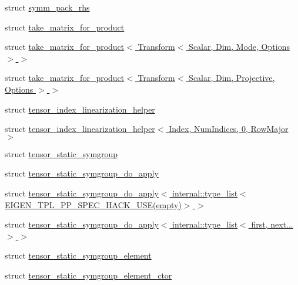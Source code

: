 \begin{DoxyCompactItemize}
\item 
struct \hyperlink{struct_eigen_1_1internal_1_1symm__pack__rhs}{symm\+\_\+pack\+\_\+rhs}
\item 
struct \hyperlink{struct_eigen_1_1internal_1_1take__matrix__for__product}{take\+\_\+matrix\+\_\+for\+\_\+product}
\item 
struct \hyperlink{struct_eigen_1_1internal_1_1take__matrix__for__product_3_01_transform_3_01_scalar_00_01_dim_00_01_mode_00_01_options_01_4_01_4}{take\+\_\+matrix\+\_\+for\+\_\+product$<$ Transform$<$ Scalar, Dim, Mode, Options $>$ $>$}
\item 
struct \hyperlink{struct_eigen_1_1internal_1_1take__matrix__for__product_3_01_transform_3_01_scalar_00_01_dim_00_0edf36e01556babc5f053852863696371}{take\+\_\+matrix\+\_\+for\+\_\+product$<$ Transform$<$ Scalar, Dim, Projective, Options $>$ $>$}
\item 
struct \hyperlink{struct_eigen_1_1internal_1_1tensor__index__linearization__helper}{tensor\+\_\+index\+\_\+linearization\+\_\+helper}
\item 
struct \hyperlink{struct_eigen_1_1internal_1_1tensor__index__linearization__helper_3_01_index_00_01_num_indices_00_010_00_01_row_major_01_4}{tensor\+\_\+index\+\_\+linearization\+\_\+helper$<$ Index, Num\+Indices, 0, Row\+Major $>$}
\item 
struct \hyperlink{struct_eigen_1_1internal_1_1tensor__static__symgroup}{tensor\+\_\+static\+\_\+symgroup}
\item 
struct \hyperlink{struct_eigen_1_1internal_1_1tensor__static__symgroup__do__apply}{tensor\+\_\+static\+\_\+symgroup\+\_\+do\+\_\+apply}
\item 
struct \hyperlink{struct_eigen_1_1internal_1_1tensor__static__symgroup__do__apply_3_01internal_1_1type__list_3_01_c8ec19381230c5f4f1bbf94f4e53c0f0}{tensor\+\_\+static\+\_\+symgroup\+\_\+do\+\_\+apply$<$ internal\+::type\+\_\+list$<$ E\+I\+G\+E\+N\+\_\+\+T\+P\+L\+\_\+\+P\+P\+\_\+\+S\+P\+E\+C\+\_\+\+H\+A\+C\+K\+\_\+\+U\+S\+E(empty)$>$ $>$}
\item 
struct \hyperlink{struct_eigen_1_1internal_1_1tensor__static__symgroup__do__apply_3_01internal_1_1type__list_3_01first_00_01next_8_8_8_01_4_01_4}{tensor\+\_\+static\+\_\+symgroup\+\_\+do\+\_\+apply$<$ internal\+::type\+\_\+list$<$ first, next... $>$ $>$}
\item 
struct \hyperlink{struct_eigen_1_1internal_1_1tensor__static__symgroup__element}{tensor\+\_\+static\+\_\+symgroup\+\_\+element}
\item 
struct \hyperlink{struct_eigen_1_1internal_1_1tensor__static__symgroup__element__ctor}{tensor\+\_\+static\+\_\+symgroup\+\_\+element\+\_\+ctor}

\end{DoxyCompactItemize}
